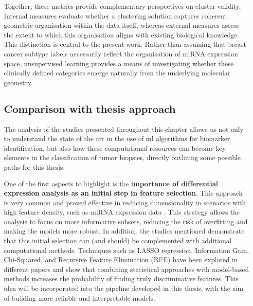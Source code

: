 Together, these metrics provide complementary perspectives on cluster validity. Internal measures evaluate whether a clustering solution captures coherent geometric organisation within the data itself, whereas external measures assess the extent to which this organisation aligns with existing biological knowledge. This distinction is central to the present work. Rather than assuming that breast cancer subtype labels necessarily reflect the organisation of miRNA expression space, unsupervised learning provides a means of investigating whether these clinically defined categories emerge naturally from the underlying molecular geometry.

\subsection{Comparison with thesis approach}

The analysis of the studies presented throughout this chapter allows us not
only to understand the state of the art in the use of \gls{ml} algorithms for
biomarker identification, but also how these computational resources can become
key elements in the classification of tumor biopsies, directly outlining some
possible paths for this thesis.

One of the first aspects to highlight is the \textbf{importance of differential
  expression analysis as an initial step in feature selection}. This approach is 
very common and proved effective in reducing dimensionality in scenarios with high feature
density, such as miRNA expression data \cite{Azari2023}. This strategy allows the analysis to
focus on more informative subsets, reducing the risk of overfitting and making
the models more robust. In addition, the studies mentioned demonstrate that
this initial selection can (and should) be complemented with additional
computational methods. Techniques such as LASSO regression, Information Gain,
Chi-Squared, and Recursive Feature Elimination (RFE) have been explored in
different papers and show that combining statistical approaches with
model-based methods increases the probability of finding truly discriminative
features. This idea will be incorporated into the pipeline developed in this
thesis, with the aim of building more reliable and interpretable models.

